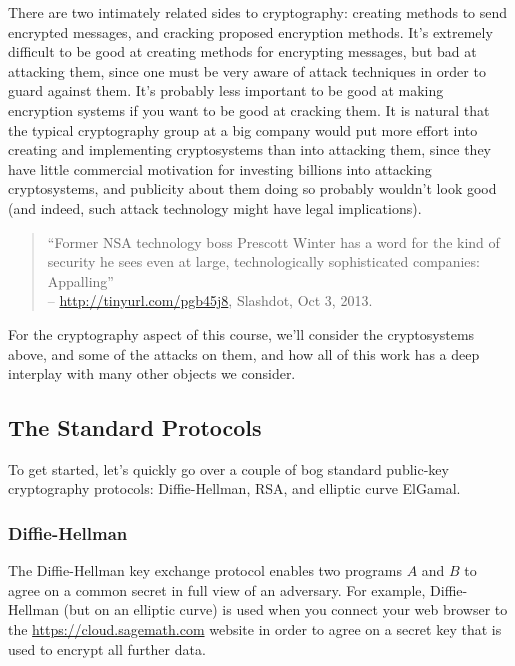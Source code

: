\documentclass{book}
\begin{document}
There are two intimately related sides to cryptography:
creating methods to send encrypted messages,
and cracking proposed encryption methods.
It's extremely difficult to be good at
creating methods for encrypting messages, but
bad at attacking them, since one must be very aware of
attack techniques in order to guard against them.
It's probably less important to be good at making encryption
systems if you want to be good at cracking them.
It is natural that the typical cryptography group at a big
company would put more effort into
creating and implementing cryptosystems than into attacking them,
since they
have little commercial motivation for investing billions
into attacking cryptosystems,
and publicity about them doing so probably wouldn't look
good (and indeed, such attack technology might have legal implications).
\begin{quote}
``Former NSA technology boss Prescott Winter has a word for the kind of security he sees even at large, technologically sophisticated companies: Appalling''\\
 -- \url{http://tinyurl.com/pgb45j8}, Slashdot, Oct 3, 2013.
\end{quote}

For the cryptography aspect of this course, we'll consider the cryptosystems above, and some of the attacks on them, and how all of this work
has a deep interplay with many other objects we consider.


\subsection{The Standard Protocols}
To get started, let's quickly go over a couple of bog
standard public-key cryptography protocols: Diffie-Hellman,
RSA, and elliptic curve ElGamal.

\subsubsection{Diffie-Hellman}
The Diffie-Hellman key exchange protocol enables two
programs $A$ and $B$ to agree on a common secret in full view of an
adversary.   For example, Diffie-Hellman (but on an elliptic curve)
is used  when you connect your web browser to the
\url{https://cloud.sagemath.com} website in order to agree
on a secret key that is used to encrypt all further data.
\end{document}

